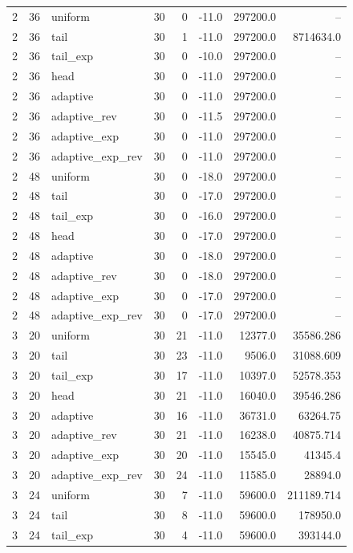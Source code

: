 \begin{tabular}{rrlrrrrr}
2 & 36 & uniform & 30 & 0 & -11.0 & 297200.0 & -- \\
2 & 36 & tail & 30 & 1 & -11.0 & 297200.0 & 8714634.0 \\
2 & 36 & tail\_exp & 30 & 0 & -10.0 & 297200.0 & -- \\
2 & 36 & head & 30 & 0 & -11.0 & 297200.0 & -- \\
2 & 36 & adaptive & 30 & 0 & -11.0 & 297200.0 & -- \\
2 & 36 & adaptive\_rev & 30 & 0 & -11.5 & 297200.0 & -- \\
2 & 36 & adaptive\_exp & 30 & 0 & -11.0 & 297200.0 & -- \\
2 & 36 & adaptive\_exp\_rev & 30 & 0 & -11.0 & 297200.0 & -- \\
2 & 48 & uniform & 30 & 0 & -18.0 & 297200.0 & -- \\
2 & 48 & tail & 30 & 0 & -17.0 & 297200.0 & -- \\
2 & 48 & tail\_exp & 30 & 0 & -16.0 & 297200.0 & -- \\
2 & 48 & head & 30 & 0 & -17.0 & 297200.0 & -- \\
2 & 48 & adaptive & 30 & 0 & -18.0 & 297200.0 & -- \\
2 & 48 & adaptive\_rev & 30 & 0 & -18.0 & 297200.0 & -- \\
2 & 48 & adaptive\_exp & 30 & 0 & -17.0 & 297200.0 & -- \\
2 & 48 & adaptive\_exp\_rev & 30 & 0 & -17.0 & 297200.0 & -- \\
3 & 20 & uniform & 30 & 21 & -11.0 & 12377.0 & 35586.286 \\
3 & 20 & tail & 30 & 23 & -11.0 & 9506.0 & 31088.609 \\
3 & 20 & tail\_exp & 30 & 17 & -11.0 & 10397.0 & 52578.353 \\
3 & 20 & head & 30 & 21 & -11.0 & 16040.0 & 39546.286 \\
3 & 20 & adaptive & 30 & 16 & -11.0 & 36731.0 & 63264.75 \\
3 & 20 & adaptive\_rev & 30 & 21 & -11.0 & 16238.0 & 40875.714 \\
3 & 20 & adaptive\_exp & 30 & 20 & -11.0 & 15545.0 & 41345.4 \\
3 & 20 & adaptive\_exp\_rev & 30 & 24 & -11.0 & 11585.0 & 28894.0 \\
3 & 24 & uniform & 30 & 7 & -11.0 & 59600.0 & 211189.714 \\
3 & 24 & tail & 30 & 8 & -11.0 & 59600.0 & 178950.0 \\
3 & 24 & tail\_exp & 30 & 4 & -11.0 & 59600.0 & 393144.0 \\

\end{tabular}
